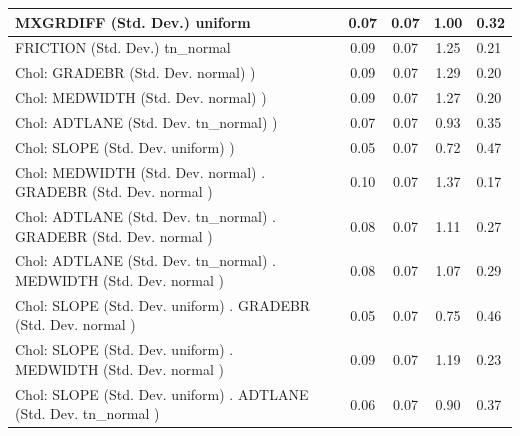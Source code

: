 \begin{table}
\begin{center}
\begin{tabular}{|l|l|c|c|c|l|}
			\hline
			MXGRDIFF (Std. Dev.) uniform &  & 0.07 & 0.07 & 1.00 & 0.32 \\
			\hline
			FRICTION (Std. Dev.) tn_normal &  & 0.09 & 0.07 & 1.25 & 0.21 \\
			\hline
			 Chol: GRADEBR (Std. Dev. normal) ) &  & 0.09 & 0.07 & 1.29 & 0.20 \\
			\hline
			 Chol: MEDWIDTH (Std. Dev. normal) ) &  & 0.09 & 0.07 & 1.27 & 0.20 \\
			\hline
			 Chol: ADTLANE (Std. Dev. tn_normal) ) &  & 0.07 & 0.07 & 0.93 & 0.35 \\
			\hline
			 Chol: SLOPE (Std. Dev. uniform) ) &  & 0.05 & 0.07 & 0.72 & 0.47 \\
			\hline
			 Chol: MEDWIDTH (Std. Dev. normal) . GRADEBR (Std. Dev.   normal ) &  & 0.10 & 0.07 & 1.37 & 0.17 \\
			\hline
			 Chol: ADTLANE (Std. Dev. tn_normal) . GRADEBR (Std. Dev.   normal ) &  & 0.08 & 0.07 & 1.11 & 0.27 \\
			\hline
			 Chol: ADTLANE (Std. Dev. tn_normal) . MEDWIDTH (Std. Dev.   normal ) &  & 0.08 & 0.07 & 1.07 & 0.29 \\
			\hline
			 Chol: SLOPE (Std. Dev. uniform) . GRADEBR (Std. Dev.   normal ) &  & 0.05 & 0.07 & 0.75 & 0.46 \\
			\hline
			 Chol: SLOPE (Std. Dev. uniform) . MEDWIDTH (Std. Dev.   normal ) &  & 0.09 & 0.07 & 1.19 & 0.23 \\
			\hline
			 Chol: SLOPE (Std. Dev. uniform) . ADTLANE (Std. Dev.   tn_normal ) &  & 0.06 & 0.07 & 0.90 & 0.37 \\
			\hline
		\end{tabular}
	\end{center}
\end{table}